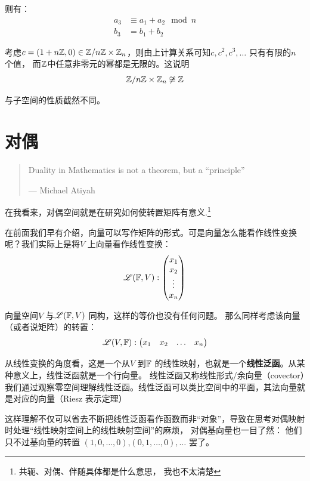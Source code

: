 则有：
\begin{align*}
    a_3 &\equiv a_1 + a_2 \mod n \\
    b_3 &= b_1 + b_2
\end{align*}

考虑\(c=(1+n\mathbb{Z},0) \in \mathbb{Z}/n\mathbb{Z} \times
\mathbb{Z}_{n}\)，则由上计算关系可知\(c, c^{2}, c^{3}, \dots \) 只有有限的\(n\) 个值，
而\(\mathbb{Z}\)中任意非零元的幂都是无限的。这说明
\[
    \mathbb{Z}/n\mathbb{Z} \times \mathbb{Z}_{n} \not\cong \mathbb{Z}
\]

与子空间的性质截然不同。

\section{对偶}

\begin{quote}
    Duality in Mathematics is not a theorem, but a ``principle''

    \hfill --- Michael Atiyah
\end{quote}

在我看来，对偶空间就是在研究如何使转置矩阵有意义.\footnote{共轭、对偶、伴随具体都是什么意思，
我也不太清楚}

在前面我们早有介绍，向量可以写作矩阵的形式。可是向量怎么能看作线性变换呢？我们实际上是将\(V\)
上向量看作线性变换：\[
    \mathscr{L}(\mathbb{F},V):
    \begin{pmatrix}
        x_1 \\
        x_2 \\
        \vdots \\
        x_n
    \end{pmatrix}
\]

向量空间\(V\) 与\(\mathscr{L}(\mathbb{F},V)\) 同构，这样的等价也没有任何问题。
那么同样考虑该向量（或者说矩阵）的转置：
\[
    \mathscr{L}(V,\mathbb{F}):
    \begin{pmatrix}
        x_1 & x_2 & \dots & x_n
    \end{pmatrix}
\]

从线性变换的角度看，这是一个从\(V\) 到\(\mathbb{F}\)
的线性映射，也就是一个\textbf{线性泛函}。从某种意义上，线性泛函就是一个行向量。
线性泛函又称线性形式/余向量（covector）我们通过观察零空间理解线性泛函。线性泛函可以类比空间中的平面，其法向量就是对应的向量（Riesz 表示定理）

这样理解不仅可以省去不断把线性泛函看作函数而非``对象''，导致在思考对偶映射时处理``线性映射空间上的线性映射空间''的麻烦，
对偶基向量也一目了然：
他们只不过基向量的转置 \((1,0,\dots ,0)\),\((0,1,\dots ,0),\dots \) 罢了。


